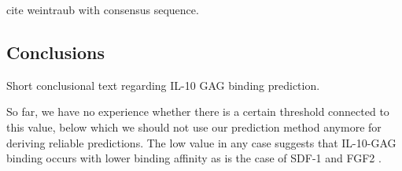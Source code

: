 cite weintraub with consensus sequence.





\subsection{Conclusions}
Short conclusional text regarding IL-10 GAG binding prediction.

 So far, we have no experience whether
there is a certain threshold connected to this value, below which we should not use our prediction method anymore for deriving reliable predictions.
The low value in any case suggests that IL-10-GAG binding occurs with lower
binding affinity as is the case of  SDF-1 and FGF2 .


